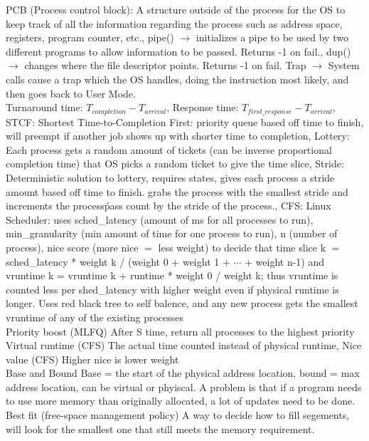 \documentclass[3pt]{article}
\begin{document}
\noindent
PCB (Process control block):
A structure outside of the process for the OS to keep track of all the information regarding the process such as address space, registers, program counter, etc.,
pipe() $\rightarrow$ initializes a pipe to be used by two different programs to allow information to be passed. Returns -1 on fail.,
dup() $\rightarrow$ changes where the file descriptor points. Returns -1 on fail.
Trap $\rightarrow$ System calls cause a trap which the OS handles, doing the instruction most likely, and then goes back to User Mode.
\\
Turnaround time:
$T_{completion} - T_{arrival}$,
Response time:
$T_{first\_response}-T_{arrival}$,
\\
STCF:
Shortest Time-to-Completion First: priority queue based off time to finish, will preempt if another job shows up with shorter time to completion,
Lottery:
Each process gets a random amount of tickets (can be inverse proportional completion time) that OS picks a random ticket to give the time slice,
Stride:
Deterministic solution to lottery, requires states, gives each process a stride amount based off time to finish. grabs the process with the smallest stride and increments the process\' pass count by the stride of the process.,
CFS:
Linux Scheduler: uses sched\_latency (amount of ms for all processes to run), min\_granularity (min amount of time for one process to run), n (number of process),
nice score (more nice $=$ less weight) to decide that time slice k $=$ sched\_latency * weight k / (weight 0 + weight 1 + $\cdots$ + weight n-1) and
vruntime k = vruntime k + runtime * weight 0 / weight k; thus vruntime is counted less per shed\_latency with higher weight even if physical runtime is longer. Uses red black tree to self balence, and any new process gets the smallest vruntime of any of the existing processes
\\
Priority boost (MLFQ)
After S time, return all processes to the highest priority
\\
Virtual runtime (CFS)
The actual time counted instead of physical runtime,
Nice value (CFS)
Higher nice is lower weight
\\
Base and Bound
Base = the start of the physical address location, bound = max address location, can be virtual or phyiscal. A problem is that if a program needs to use more memory than originally allocated, a lot of updates need to be done.
\\
Best fit (free-space management policy)
A way to decide how to fill segements, will look for the smallest one that still meets the memory requirement.
\end{document}
